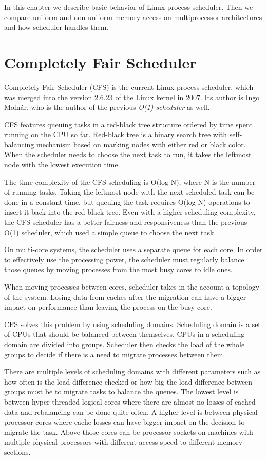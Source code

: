 In this chapter we describe basic behavior of Linux process scheduler. Then we
compare uniform and non-uniform memory access on multiprocessor architectures
and how scheduler handles them.

\section{Completely Fair Scheduler}
Completely Fair Scheduler (CFS) is the current Linux process scheduler, which was
merged into the version 2.6.23 of the Linux kernel in 2007. Its author is Ingo
Molnár, who is the author of the previous \emph{O(1) scheduler} as well.

CFS features queuing tasks in a red-black tree structure ordered by time spent
running on the CPU so far. Red-black tree is a binary search
tree with self-balancing mechanism based on marking nodes with either red or
black color. When the scheduler needs to choose the next task to run, it takes
the leftmost node with the lowest execution time.

The time complexity of the CFS scheduling is O(log N), where N is the number
of running tasks. Taking the leftmost node
with the next scheduled task can be done in a constant time, but queuing the task
requires O(log N) operations to insert it back into the red-black tree. Even
with a higher scheduling complexity, the CFS scheduler has a better fairness and
responsiveness than the previous O(1) scheduler, which used a simple queue to
choose the next task.

On multi-core systems, the scheduler uses a separate queue for each core. In
order to effectively use the processing power, the scheduler must regularly
balance those queues by moving processes from the most busy cores to idle ones.

When moving processes between cores, scheduler takes in the account a topology
of the system. Losing data from caches after the migration can have a bigger
impact on performance than leaving the process on the busy core.

CFS solves this problem by using scheduling
domains\;\cite{understanding-linux-kernel}. Scheduling domain is a set
of CPUs that should be balanced between themselves. CPUs in a scheduling domain
are divided into groups. Scheduler then checks the load of the whole groups to
decide if there is a need to migrate processes between them.

There are multiple levels of scheduling domains with different parameters such as
how often is the load difference checked or how big the load difference between
groups must be to migrate tasks to balance the queues.
The lowest level is between hyper-threaded logical cores where there are almost
no losses of cached data and rebalancing can be done quite often.
A higher level is between physical processor cores where cache losses can have
bigger impact on the decision to migrate the task.
Above those cores can be processor sockets on machines with multiple physical
processors with different access speed to different memory sections.

